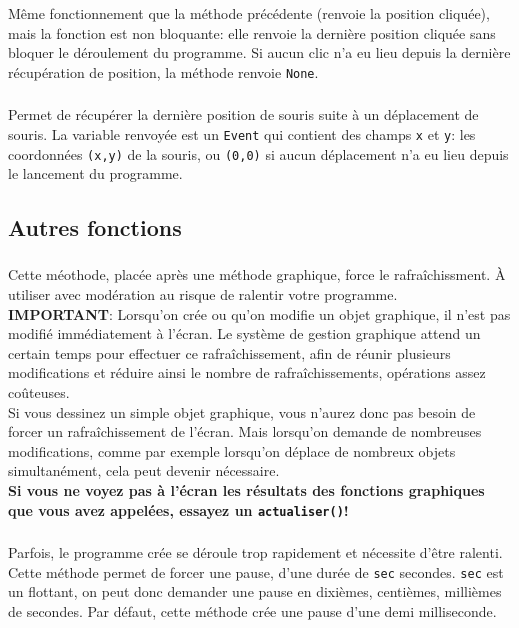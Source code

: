 \documentclass[11pt,a4paper]{article}
\begin{document}
\subsubsection*{}
Même fonctionnement que la méthode précédente (renvoie la position cliquée), mais la fonction est non bloquante: elle renvoie la dernière position cliquée sans bloquer le déroulement du programme.  Si aucun clic n'a eu lieu depuis la dernière récupération de position, la méthode renvoie {\tt None}. 

\subsubsection*{}
Permet de récupérer la dernière position de souris suite à un déplacement de souris. La variable renvoyée est un {\tt Event} qui contient des champs {\tt x} et {\tt y}: les coordonnées {\tt (x,y)} de la souris, ou {\tt (0,0)} si aucun déplacement n'a eu lieu depuis le lancement du programme.


\subsection*{Autres fonctions}

\subsubsection*{}
Cette méothode, placée après une méthode graphique, force le rafraîchissment. \`A utiliser avec modération au risque de ralentir votre programme.\\

{\bf IMPORTANT}: Lorsqu'on crée ou qu'on modifie un objet graphique, il n'est pas modifié immédiatement à l'écran. Le système de gestion graphique attend un certain temps pour effectuer ce rafraîchissement, afin de réunir plusieurs modifications et réduire ainsi le nombre de rafraîchissements, opérations assez coûteuses.\\
Si vous dessinez un simple objet graphique, vous n'aurez donc pas besoin de forcer un rafraîchissement de l'écran. Mais lorsqu'on demande de nombreuses modifications, comme par exemple lorsqu'on déplace de nombreux objets simultanément, cela peut devenir nécessaire.\\
{\bf Si vous ne voyez pas à l'écran les résultats des fonctions graphiques que vous avez appelées, essayez un {\tt actualiser()}!}

\subsubsection*{}
Parfois, le programme crée se déroule trop rapidement et nécessite d'être ralenti. Cette méthode permet de forcer une pause, d'une durée de {\tt sec} secondes. {\tt sec} est un flottant, on peut donc demander une pause en dixièmes, centièmes, millièmes de secondes. Par défaut, cette méthode crée une pause d'une demi milliseconde.
\end{document}
